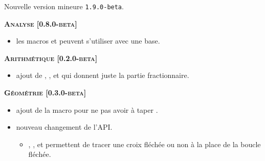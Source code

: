 \documentclass[12pt,a4paper]{book}
\begin{document}
\begin{description}
\end{description}\begin{description}
\medskip
\item[2020-08-26] Nouvelle version mineure \verb+1.9.0-beta+.




\begin{center}
    \textbf{\textsc{Analyse [0.8.0-beta]}}
\end{center}

\begin{itemize}[itemsep=.5em]
    \item {}
          les macros  et  peuvent s'utiliser avec une base.
    
\end{itemize}


\separation




\begin{center}
    \textbf{\textsc{Arithmétique [0.2.0-beta]}}
\end{center}

\begin{itemize}[itemsep=.5em]
    \item {}
    	  ajout de , ,  et  qui donnent juste la partie fractionnaire.
\end{itemize}


\separation




\begin{center}
    \textbf{\textsc{Géométrie [0.3.0-beta]}}
\end{center}

\begin{itemize}[itemsep=.5em]
    \item {}
          ajout de la macro  pour ne pas avoir à taper .


    \item {} nouveau changement de l'API.
    \begin{itemize}[itemsep=.5em]
        \item {}, ,  et  permettent de tracer une croix fléchée ou non à la place de la boucle fléchée.


\end{itemize}
\end{itemize}
\end{description}
\end{document}
